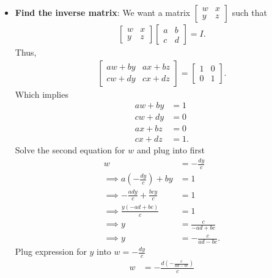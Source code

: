 \documentclass{report}
\begin{document}
\begin{itemize}
        \item \textbf{Find the inverse matrix}: We want a matrix $ \begin{bmatrix} w & x \\ y & z\end{bmatrix} $ such that
            \begin{align*}
                \begin{bmatrix} w & x \\ y & z  \end{bmatrix}  \begin{bmatrix} a & b \\ c& d\end{bmatrix} = I
            .\end{align*}
            Thus,
            \begin{align*}
                \begin{bmatrix} aw + by & ax + bz \\ cw + dy & cx + dz\end{bmatrix} = \begin{bmatrix} 1 & 0 \\ 0 & 1\end{bmatrix}
            .\end{align*}
            Which implies
            \begin{align*}
                aw + by &= 1 \\
                cw + dy &= 0 \\
                ax + bz &= 0\\
                cx + dz &= 1
            .\end{align*}
            Solve the second equation for $w$ and plug into first
            \begin{align*}
                w &= -\frac{dy}{c} \\
                \implies a\left(-\frac{dy}{c}\right) + by &= 1 \\
                \implies -\frac{ady}{c} + \frac{bcy}{c} & =1 \\
                \implies \frac{y(-ad + bc)}{c} &=1 \\
                \implies y &= \frac{c}{-ad+bc} \\
                \implies y &= -\frac{c}{ad-bc}
            .\end{align*}
            Plug expression for $y$ into $w = -\frac{dy}{c}$
            \begin{align*}
                w &= -\frac{d\left(-\frac{c}{ad-bc}\right)}{c} \\

\end{align*}
\end{itemize}
\end{document}
